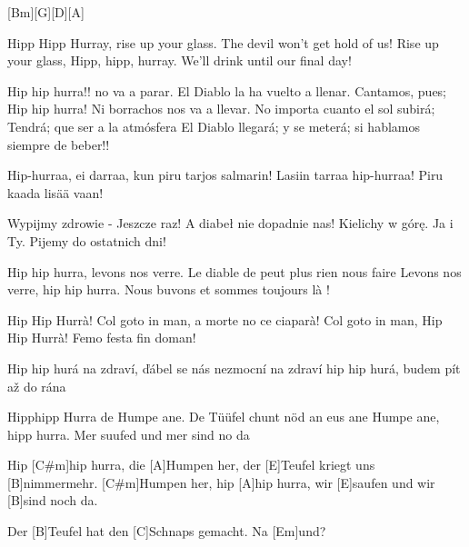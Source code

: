\begin{guitar}
	\begin{highlightbar}
		[Bm]{}[G]{}[D]{}[A]{}
		
		Hipp Hipp Hurray, rise up your glass. The devil won't get hold of us!
		Rise up your glass, Hipp, hipp, hurray. We'll drink until our final day!
		
		Hip hip hurra!! no va a parar. 	El Diablo la ha vuelto a llenar.
		Cantamos, pues; Hip hip hurra! Ni borrachos nos va a llevar.
		No importa cuanto el sol subirá; Tendrá; que ser a la atmósfera
		El Diablo llegará; y se meterá; si hablamos siempre de beber!!﻿
		
		Hip-hurraa, ei darraa, kun piru tarjos salmarin!
		Lasiin tarraa hip-hurraa! Piru kaada lisää vaan!
		
		Wypijmy zdrowie - Jeszcze raz! A diabeł nie dopadnie nas!
		Kielichy w górę. Ja i Ty. Pijemy do ostatnich dni!﻿
		
		Hip hip hurra, levons nos verre. Le diable de peut plus rien nous faire
		Levons nos verre, hip hip hurra. Nous buvons et sommes toujours là !
		
		Hip Hip Hurrà! Col goto in man, a morte no ce ciaparà!
		Col goto in man, Hip Hip Hurrà! Femo festa fin doman!﻿
		
		Hip hip hurá na zdraví, ďábel se nás nezmocní
		na zdraví hip hip hurá, budem pít až do rána
		
		Hipphipp Hurra de Humpe ane. De Tüüfel chunt nöd an eus ane
		Humpe ane, hipp hurra. Mer suufed und mer sind no da﻿
		
		Hip [C#m]hip hurra, die [A]Humpen her, der [E]Teufel kriegt uns [B]nimmermehr.
		[C#m]Humpen her, hip [A]hip hurra, wir [E]saufen und wir [B]sind noch da.
	\end{highlightbar}
	
	Der [B]Teufel hat den [C]Schnaps gemacht. Na [Em]und?
\end{guitar}